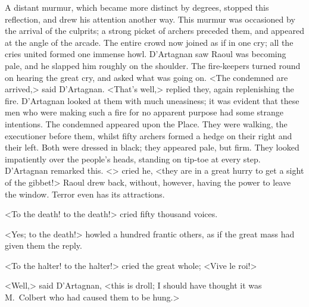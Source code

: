 A distant murmur, which became more distinct by degrees, stopped this reflection, and drew his attention another way. This murmur was occasioned by the arrival of the culprits; a strong picket of archers preceded them, and appeared at the angle of the arcade. The entire crowd now joined as if in one cry; all the cries united formed one immense howl. D'Artagnan saw Raoul was becoming pale, and he slapped him roughly on the shoulder. The fire-keepers turned round on hearing the great cry, and asked what was going on. <The condemned are arrived,> said D'Artagnan. <That's well,> replied they, again replenishing the fire. D'Artagnan looked at them with much uneasiness; it was evident that these men who were making such a fire for no apparent purpose had some strange intentions. The condemned appeared upon the Place. They were walking, the executioner before them, whilst fifty archers formed a hedge on their right and their left. Both were dressed in black; they appeared pale, but firm. They looked impatiently over the people's heads, standing on tip-toe at every step. D'Artagnan remarked this. <> cried he, <they are in a great hurry to get a sight of the gibbet!> Raoul drew back, without, however, having the power to leave the window. Terror even has its attractions.

<To the death! to the death!> cried fifty thousand voices.

<Yes; to the death!> howled a hundred frantic others, as if the great mass had given them the reply.

<To the halter! to the halter!> cried the great whole; <Vive le roi!>

<Well,> said D'Artagnan, <this is droll; I should have thought it was M.~Colbert who had caused them to be hung.>

